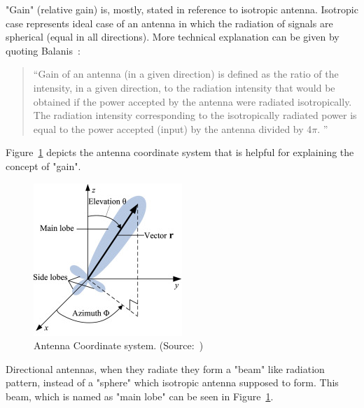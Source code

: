 \documentclass[12pt, oneandhalf, chaparabic, sees, ms]{metu}
\begin{document}
"Gain" (relative gain) is, mostly, stated in reference to isotropic antenna. Isotropic case represents ideal case of an antenna in which the radiation of signals are spherical 
(equal in all directions). More technical explanation can be given by quoting Balanis~\cite{balanis2016}:
%
%
\begin{quote}
\enquote{Gain of an antenna (in a given direction) is defined as the ratio of the intensity, in a given direction, 
to the radiation intensity that would be obtained if the power accepted by the antenna were
radiated isotropically. The radiation intensity corresponding to the isotropically radiated power is
equal to the power accepted (input) by the antenna divided by 4$\pi$.
}
\end{quote}
%
%
Figure~\ref{fig:antenna-coor} depicts the antenna coordinate system that is helpful for explaining the concept of "gain".
% 
%
%
\begin{figure}[!htbp]
 \begin{center}
  \includegraphics[width=0.5\textwidth]{antenna-coor.png}
 \end{center}
 \caption{Antenna Coordinate system. (Source:~\protect\cite{xli2015})}
  \label{fig:antenna-coor}
\end{figure}
% 
%
%
%
Directional antennas, when they radiate they form a "beam" like radiation pattern, instead of a "sphere" which isotropic antenna supposed to form.
This beam, which is named as "main lobe" can be seen in Figure~\ref{fig:antenna-coor}.  
\end{document}
